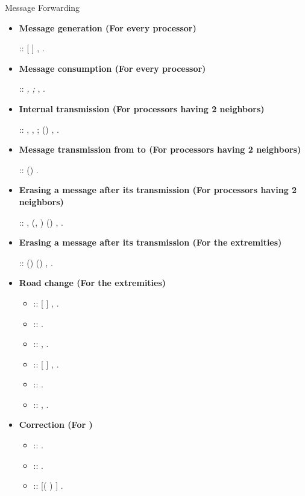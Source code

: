 \documentclass{llncs}
\begin{document}
\begin{algorithm}[htb]
\caption{Message Forwarding \label{algo:MF}}
\begin{scriptsize}

   \begin{itemize}
       \item{\textbf{Message generation (For every processor) }}

     ::     [  ]  \textit{ } , .\\

       \item{\textbf{Message consumption (For every processor) }}

     :: \textit{, ; }  , .\\

        \item{\textbf{Internal transmission (For processors having 2 neighbors) }}

:: , , ;   ()  , .\\


         \item{\textbf{Message transmission from  to  (For processors having 2 neighbors) }} 

::      ()   .\\


         \item{\textbf{Erasing a message after its transmission (For processors having 2 neighbors) }}

:: ,   (,
)  ()    , .\\
             


         \item{\textbf{Erasing a message after its transmission (For the extremities) }}

::      
		() 
		 ()    , .\\
             
\item{\textbf{Road change (For the extremities) }}\begin{itemize}
               \item{::   [  ]  , .}
               \item{::       . }
               \item{::         , .}
               \item{::       [  ]     , .}
               \item{::              .}
               \item{::              , .}\\
           \end{itemize}
       \item{\textbf{Correction  (For ) }}\begin{itemize}
             \item{::       .}
             \item{::       .}
             \item{::       [(  )  ]  .}
            \end{itemize}       
       
  \end{itemize}
  \end{scriptsize}
  \end{algorithm}
\end{document}
